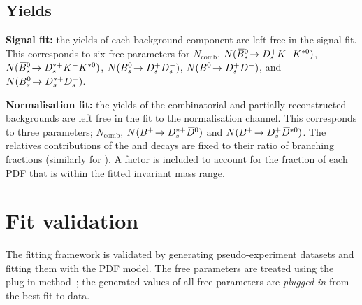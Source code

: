 \subsection{Yields}
\begin{description}
\item \textbf{Signal fit:} the yields of each background component are left free in the signal fit. This corresponds to six free parameters for $N_{\text{comb}}$, $N({{\kern 0.18em\overline{\kern -0.18em B}{}}{}^0_{s}}\!\rightarrow {\ensuremath{{D}^+_{s}}}{\ensuremath{{K}^-}}{\ensuremath{{K}^{*0}}})$, $N({{\kern 0.18em\overline{\kern -0.18em B}{}}{}^0_{s}}\!\rightarrow {\ensuremath{{D}^{*+}_{s}}}{\ensuremath{{K}^-}}{\ensuremath{{K}^{*0}}})$, $N({{B}^0_{s}}\!\rightarrow {\ensuremath{{D}^+_{s}}}{\ensuremath{{D}^-_{s}}})$, $N({{B}^0}\!\rightarrow {\ensuremath{{D}^+_{s}}}{\ensuremath{{D}^-}})$, and $N({{B}^0_{s}}\!\rightarrow {\ensuremath{{D}^{*+}_{s}}}{\ensuremath{{D}^-_{s}}})$.

\item \textbf{Normalisation fit:} the yields of the combinatorial and partially reconstructed backgrounds are left free in the fit to the normalisation channel. This corresponds to three parameters; $N_{\text{comb}}$, $N({{{B}^+}}\!\rightarrow {\ensuremath{{D}^{*+}_{s}}}{\ensuremath{{\kern 0.2em\overline{\kern -0.2em D}{}}{}^0}})$ and $N({{{B}^+}}\!\rightarrow {\ensuremath{{D}^+_{s}}}{\ensuremath{{\kern 0.2em\overline{\kern -0.2em D}{}}{}^{*0}}})$. The relatives contributions of the \decay{\Dssp}{\Dsp\piz} and \decay{\Dssp}{\Dsp\Pgamma} decays are fixed to their ratio of branching fractions (similarly for \Dstarzb). A factor is included to account for the fraction of each PDF that is within the fitted \Bp invariant mass range.
\end{description}




\section{Fit validation}
\label{sec:B2DsKK_fitvalidation}

The fitting framework is validated by generating pseudo-experiment datasets and fitting them with the PDF model. The free parameters are treated using the plug-in method~\cite{plugin}; the generated values of all free parameters are \emph{plugged in} from the best fit to data.      

